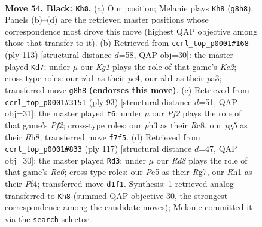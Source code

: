 \documentclass[11pt]{article}
\begin{document}
\clearpage

\begin{figure}[p]\centering
\begin{subfigure}{0.46\textwidth}\centering
\resizebox{\linewidth}{!}{%
\newchessgame
\chessboard[
  setfen={6k1/5p1p/1n4p1/p3p1P1/P3P3/1P2K1RP/6P1/RN1r3r b - - 23 54},
  showmover=false,
  pgfstyle=straightmove, color=movearrow, markmove={g8-h8}
]}
\caption{}
\end{subfigure}\hfill
\begin{subfigure}{0.46\textwidth}\centering
\resizebox{\linewidth}{!}{%
\newchessgame
\chessboard[
  setfen={8/r3k3/3p2p1/3P1p2/r1PKpPpP/PRR3P1/8/8 b - - 3 57},
  showmover=false,
  pgfstyle=straightmove, color=movearrow, markmove={e7-d7}
]}
\caption{}
\end{subfigure}
\\[4pt]
\begin{subfigure}{0.46\textwidth}\centering
\resizebox{\linewidth}{!}{%
\newchessgame
\chessboard[
  setfen={2r4r/1p1nkp2/8/1P1Rpp2/p1P5/3N1PPp/P1R2K1P/8 b - - 1 47},
  showmover=false,
  pgfstyle=straightmove, color=movearrow, markmove={f7-f6}
]}
\caption{}
\end{subfigure}\hfill
\begin{subfigure}{0.46\textwidth}\centering
\resizebox{\linewidth}{!}{%
\newchessgame
\chessboard[
  setfen={5k2/2p3rp/1p1p1n2/p7/2P2p2/1PN1rP1P/P1R3P1/6RK b - - 4 59},
  showmover=false,
  pgfstyle=straightmove, color=movearrow, markmove={e3-d3}
]}
\caption{}
\end{subfigure}
\caption{\textbf{Move 54, Black: \texttt{Kh8}.} (a) Our position; Melanie plays \texttt{Kh8} (\texttt{g8h8}). Panels (b)--(d) are the retrieved master positions whose correspondence most drove this move (highest QAP objective among those that transfer to it). (b) Retrieved from \texttt{ccrl\_top\_p0001\#168} (ply 113) [structural distance $d$=58, QAP obj=30]: the master played \texttt{Kd7}; under $\mu$ our \emph{Kg1} plays the role of that game's \emph{Ke2}; cross-type roles: our \emph{n}b1 as their \emph{p}c4, our \emph{n}b1 as their \emph{p}a3; transferred move \texttt{g8h8} \textbf{(endorses this move)}. (c) Retrieved from \texttt{ccrl\_top\_p0001\#3151} (ply 93) [structural distance $d$=51, QAP obj=31]: the master played \texttt{f6}; under $\mu$ our \emph{Pf2} plays the role of that game's \emph{Pf2}; cross-type roles: our \emph{p}h3 as their \emph{R}c8, our \emph{p}g5 as their \emph{R}h8; transferred move \texttt{f7f5}. (d) Retrieved from \texttt{ccrl\_top\_p0001\#833} (ply 117) [structural distance $d$=47, QAP obj=30]: the master played \texttt{Rd3}; under $\mu$ our \emph{Rd8} plays the role of that game's \emph{Re6}; cross-type roles: our \emph{P}e5 as their \emph{R}g7, our \emph{R}h1 as their \emph{P}f4; transferred move \texttt{d1f1}. Synthesis: 1 retrieved analog transferred to \texttt{Kh8} (summed QAP objective 30, the strongest correspondence among the candidate moves); Melanie committed it via the \texttt{search} selector.}
\label{fig:thought-m107}
\end{figure}
\end{document}

